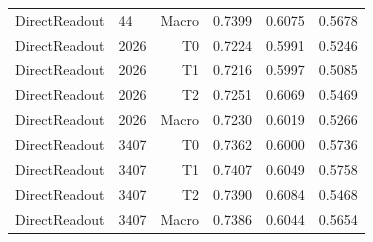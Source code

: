 \begin{table}[t]
\begin{tabular}{llrrrr}
DirectReadout & 44 & Macro & 0.7399 & 0.6075 & 0.5678 \\
DirectReadout & 2026 & T0 & 0.7224 & 0.5991 & 0.5246 \\
DirectReadout & 2026 & T1 & 0.7216 & 0.5997 & 0.5085 \\
DirectReadout & 2026 & T2 & 0.7251 & 0.6069 & 0.5469 \\
DirectReadout & 2026 & Macro & 0.7230 & 0.6019 & 0.5266 \\
DirectReadout & 3407 & T0 & 0.7362 & 0.6000 & 0.5736 \\
DirectReadout & 3407 & T1 & 0.7407 & 0.6049 & 0.5758 \\
DirectReadout & 3407 & T2 & 0.7390 & 0.6084 & 0.5468 \\
DirectReadout & 3407 & Macro & 0.7386 & 0.6044 & 0.5654 \\
\bottomrule
\end{tabular}
\end{table}
